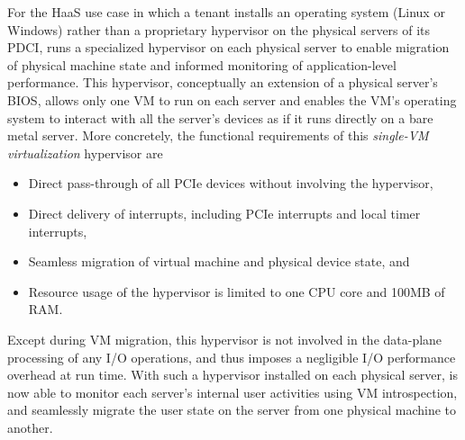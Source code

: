 For the HaaS use case in which a tenant installs an operating system (Linux or Windows) rather than a proprietary hypervisor on the physical servers of its PDCI, \na runs a specialized hypervisor on each physical server to enable migration of physical machine state and informed monitoring of application-level performance. This hypervisor, conceptually an extension of a physical server's BIOS, allows only one VM to run on each server and enables the VM's operating system to interact with all the server's devices as if it runs directly on a bare metal server.
More concretely, the functional requirements of this {\em single-VM virtualization} hypervisor are
\begin{itemize} 
\setlength\itemsep{-0.04in}
\item Direct pass-through of all PCIe devices without involving the hypervisor,
\item Direct delivery of interrupts, including PCIe interrupts and local timer interrupts, 
\item Seamless migration of virtual machine and physical device state, and 
\item Resource usage of the hypervisor is limited to one CPU core and 100MB of RAM.
\end{itemize}
Except during VM migration, this hypervisor is not involved in the data-plane processing of any I/O operations, and thus imposes a negligible I/O performance overhead at run time.  
With such a hypervisor installed on each physical server, \na is now able to monitor each server's internal user activities using VM introspection, and seamlessly migrate the user state on the server from one physical machine to another. 

